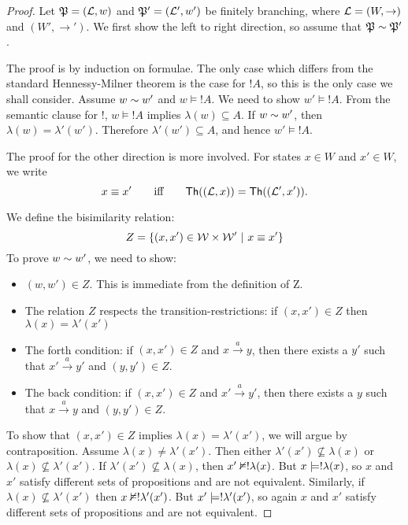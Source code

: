 \begin{proof}
\NI Let $\frak{P} = (\mathcal{L}, w)$ and $\frak{P}' = (\mathcal{L}', w')$ be finitely
branching, where $\mathcal{L} = (W, \rightarrow)$ and $(W', \rightarrow')$.
We first show the left to right direction, so assume that $\frak{P} \sim
\frak{P}'$.

The proof is by induction on formulae.  The only case which differs
from the standard Hennessy-Milner theorem is the case for $!A$, so
this is the only case we shall consider.  Assume $w \sim w'$ and $w
\models !A$. We need to show $w' \models !A$.
From the semantic clause for $!$, $w \models !A$ implies $\lambda(w)
\subseteq A$.  If $w \sim w'$, then $\lambda(w) = \lambda'(w')$.
Therefore $\lambda'(w') \subseteq A$, and hence $w' \models !A$.

The proof for the other direction is more involved.
For states $x \in W$ and $x' \in W$, we write 
\[
   x \equiv x'
      \qquad\text{iff}\qquad
   \mathsf{Th}((\mathcal{L}, x)) = \mathsf{Th}((\mathcal{L}', x')).
\]

We define the bisimilarity relation:
\[
   Z = \{(x,x') \in \mathcal{W} \times \mathcal{W}' \ | \  x \equiv x' \}
\]
To prove $w \sim w'$, we need to show:
\begin{itemize}

\item $(w,w') \in Z$. This is immediate from the definition of Z.

\item The relation $Z$ respects the transition-restrictions: if
  $(x,x') \in Z$ then $\lambda(x) = \lambda'(x')$

\item The forth condition: if $(x,x') \in Z$ and $x \xrightarrow{a}
  y$, then there exists a $y'$ such that $x' \xrightarrow{a} y'$ and $(y, y') \in Z$.

\item The back condition: if $(x,x') \in Z$ and $x' \xrightarrow{a}
  y'$, then there exists a $y$ such that $x \xrightarrow{a} y$ and $(y, y') \in Z$.

\end{itemize}
To show that $(x,x') \in Z$ implies $\lambda(x) = \lambda'(x')$, we
will argue by contraposition.  Assume $\lambda(x) \neq \lambda'(x')$.
Then either $\lambda'(x') \nsubseteq \lambda(x)$ or $\lambda(x)
\nsubseteq \lambda'(x')$.  If $\lambda'(x') \nsubseteq \lambda(x)$,
then $x' \nvDash ! \lambda(x)$.  But $x \models !
\lambda(x)$, so $x$ and $x'$ satisfy different sets of propositions
and are not equivalent.  Similarly, if $\lambda(x) \nsubseteq
\lambda'(x')$ then $x \nvDash ! \lambda'(x')$.  But $x' \models
! \lambda'(x')$, so again $x$ and $x'$ satisfy different sets of
propositions and are not equivalent.


\end{proof}
